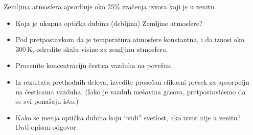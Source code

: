 \documentclass[12pt]{article}
\begin{document}
Zemljina atmosfera apsorbuje oko 25\% zra\v{c}enja izvora koji je u zenitu.
\begin{itemize}
    \item Koja je ukupna opti\v{c}ka dubina (debljina) Zemljine atmosfere?
    \item Pod pretpostavkom da je temperatura atmosfere konstantna, i da iznosi oko 300\,K, odredite skalu visine za zemljinu atmosferu.
    \item Procenite koncentraciju \v{c}estica vazduha na povr\v{s}ini. 
    \item Iz rezultata prethodnih delova, izvedite prose\v{c}an efikasni presek za apsorpciju na \v{c}esticama vazduha. (Iako je vazduh me\v{s}avina gasova, pretpostavi\'{c}emo da se svi pona\v{s}aju isto.)
    \item Kako se menja opti\v{c}ka dubina koju ``vidi'' svetlost, ako izvor nije u zenitu? Dati opisan odgovor.
\end{itemize}
\end{document}

